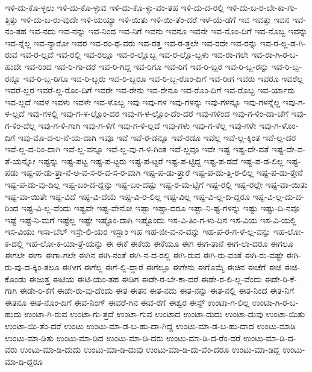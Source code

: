 {ಇಳಿ-ದು-ಕೊ-ಳ್ಳಲು
ಇಳಿ-ದು-ಕೊ-ಳ್ಳುವ
ಇಳಿ-ದು-ಕೊ-ಳ್ಳು-ವಂ-ತಹ
ಇಳಿ-ದು-ದ-ರಲ್ಲಿ
ಇಳಿ-ದು-ಬ-ರ-ಬೇ-ಕಾ-ಗು-ತ್ತಿತ್ತು
ಇಳಿ-ದು-ಬ-ರು-ವುದೇ
ಇಳಿ-ಯಯ್ಯಾ
ಇಳಿ-ಯಿತು
ಇಳಿ-ಯಿ-ತೆಂ-ದರೆ
ಇಳೆ-ಯೆ-ಡೆಗೆ
ಇವ
ಇವತ್ತು
ಇವನ
ಇವ-ನಂ-ತಹ
ಇವ-ನದು
ಇವ-ನನ್ನು
ಇವ-ನಿಂದ
ಇವ-ನಿಗೆ
ಇವನು
ಇವನೂ
ಇವನೇ
ಇವ-ನೊಂ-ದಿಗೆ
ಇವ-ನೊಬ್ಬ
ಇವನ್ನು
ಇವ-ನ್ನೆಲ್ಲ
ಇವ-ನ್ಯಾರೋ
ಇವರ
ಇವ-ರಂ-ಥ-ವರು
ಇವ-ರತ್ತ
ಇವ-ರ-ತ್ತಲೇ
ಇವ-ರದೇ
ಇವ-ರನ್ನು
ಇವ-ರ-ಲ್ಲ-ಡ-ಗಿ-ರುವ
ಇವ-ರ-ಲ್ಲದೆ
ಇವ-ರಲ್ಲಿ
ಇವ-ರಲ್ಲೂ
ಇವ-ರ-ಲ್ಲೊಬ್ಬ
ಇವ-ರ-ಲ್ಲೊ-ಬ್ಬಳು
ಇವ-ರಾ-ಗಲೇ
ಇವ-ರಾ-ಗಿ-ರ-ಬ-ಹುದೇ
ಇವ-ರಿಂದ
ಇವ-ರಿ-ಗಾ-ದರೆ
ಇವ-ರಿ-ಗಿದ್ದ
ಇವ-ರಿಗೂ
ಇವ-ರಿಗೆ
ಇವ-ರಿ-ಬ್ಬರ
ಇವ-ರಿ-ಬ್ಬ-ರನ್ನು
ಇವ-ರಿ-ಬ್ಬ-ರನ್ನೂ
ಇವ-ರಿ-ಬ್ಬ-ರಿಗೂ
ಇವ-ರಿ-ಬ್ಬರು
ಇವ-ರಿ-ಬ್ಬರೂ
ಇವ-ರಿ-ಬ್ಬ-ರೊಂ-ದಿಗೆ
ಇವ-ರೀಗ
ಇವರು
ಇವರೂ
ಇವರೆಲ್ಲ
ಇವರೆ-ಲ್ಲರ
ಇವರೆ-ಲ್ಲ-ರೊಂ-ದಿಗೆ
ಇವರೇ
ಇವ-ರೇನು
ಇವ-ರೇನೂ
ಇವ-ರೊಂ-ದಿಗೆ
ಇವ-ರೊಬ್ಬ
ಇವ-ರ್ಯಾರು
ಇವ-ಲ್ಲದೆ
ಇವಳ
ಇವಳು
ಇವಳೇ
ಇವ-ಳೊಬ್ಬ
ಇವು
ಇವು-ಗಳ
ಇವು-ಗಳನ್ನು
ಇವು-ಗಳನ್ನೂ
ಇವು-ಗಳನ್ನೆಲ್ಲ
ಇವು-ಗ-ಳ-ಲ್ಲದೆ
ಇವು-ಗಳಲ್ಲಿ
ಇವು-ಗ-ಳ-ಲ್ಲೊಂ-ದರ
ಇವು-ಗ-ಳ-ಲ್ಲೊಂ-ದೆಂ-ದರೆ
ಇವು-ಗಳಿಂದ
ಇವು-ಗ-ಳಿಂ-ದಾ-ಚೆಗೆ
ಇವು-ಗ-ಳಿಂ-ದೆಲ್ಲ
ಇವು-ಗ-ಳಿ-ಗಾಗಿ
ಇವು-ಗ-ಳಿಗೆ
ಇವು-ಗ-ಳಿ-ಲ್ಲದೆ
ಇವು-ಗಳು
ಇವು-ಗ-ಳೆಲ್ಲ
ಇವು-ಗಳೇ
ಇವು-ಗ-ಳೊಂ-ದಿಗೆ
ಇವು-ಮೊ-ದ-ಲ-ನೆ-ಯ-ದಾಗಿ
ಇವೂ
ಇವೆ
ಇವೆ-ರ-ಡನ್ನೂ
ಇವೆ-ರಡೂ
ಇವೆಲ್ಲ
ಇವೆ-ಲ್ಲ-ಕ್ಕಿಂತ
ಇವೆ-ಲ್ಲ-ದರ
ಇವೆ-ಲ್ಲ-ದ-ರಿಂ-ದಾಗಿ
ಇವೆ-ಲ್ಲ-ವನ್ನೂ
ಇವೆ-ಲ್ಲ-ವು-ಗ-ಳಿ-ಗಿಂತ
ಇವೆ-ಲ್ಲವೂ
ಇವೇ
ಇಷ್ಟ
ಇಷ್ಟ-ದೇ-ವತೆ
ಇಷ್ಟ-ದೇ-ವ-ತೆ-ಯನ್ನೋ
ಇಷ್ಟನ್ನು
ಇಷ್ಟ-ಪಟ್ಟ
ಇಷ್ಟ-ಪ-ಟ್ಟರು
ಇಷ್ಟ-ಪ-ಟ್ಟರೆ
ಇಷ್ಟ-ಪ-ಟ್ಟಿದ್ದ
ಇಷ್ಟ-ಪ-ಡದೆ
ಇಷ್ಟ-ಪ-ಡ-ಲಿಲ್ಲ
ಇಷ್ಟ-ಪಡು
ಇಷ್ಟ-ಪ-ಡು-ತ್ತಾ-ನೆ-ಅ-ವ-ಸ-ರ-ವ-ಸ-ರ-ವಾಗಿ
ಇಷ್ಟ-ಪ-ಡು-ತ್ತಾರೆ
ಇಷ್ಟ-ಪ-ಡು-ತ್ತಿ-ರ-ಲಿಲ್ಲ
ಇಷ್ಟ-ಪ-ಡು-ತ್ತೇನೆ
ಇಷ್ಟ-ಪ-ಡು-ವು-ದಿಲ್ಲ
ಇಷ್ಟ-ಬಂ-ದ-ದ್ದನ್ನು
ಇಷ್ಟ-ಬಂ-ದಷ್ಟು
ಇಷ್ಟ-ರ-ಮ-ಟ್ಟಿಗೆ
ಇಷ್ಟ-ರಲ್ಲಿ
ಇಷ್ಟ-ರಲ್ಲೇ
ಇಷ್ಟ-ವಾ-ಯಿತು
ಇಷ್ಟ-ವಾ-ಯಿತೇ
ಇಷ್ಟ-ವಿದೆ
ಇಷ್ಟ-ವಿ-ದೆಯೆ
ಇಷ್ಟ-ವಿ-ರ-ಲಿಲ್ಲ
ಇಷ್ಟ-ವಿಲ್ಲ
ಇಷ್ಟ-ವಿ-ಲ್ಲ-ದಿ-ದ್ದರೂ
ಇಷ್ಟ-ವಿ-ಲ್ಲ-ದು-ದ-ರಿಂದ
ಇಷ್ಟ-ವಿ-ಲ್ಲ-ವೆಂದು
ಇಷ್ಟವೇ
ಇಷ್ಟ-ವೇನೋ
ಇಷ್ಟಾ
ಇಷ್ಟಾ-ದರೂ
ಇಷ್ಟಾ-ನಿ-ಷ್ಟ-ಗಳನ್ನು
ಇಷ್ಟು
ಇಷ್ಟು-ದಿ-ನವೂ
ಇಷ್ಟೆ
ಇಷ್ಟೆ-ನಿ-ಮಗೆ
ಇಷ್ಟೆಲ್ಲ
ಇಷ್ಟೇ
ಇಷ್ಟೊಂ-ದಾಗಿ
ಇಷ್ಟೊಂದು
ಇಸ-ವಿ-ತಿಂ-ಗ-ಳು-ದಿನ
ಇಸ-ವಿಯ
ಇಸ-ವಿ-ಯಲ್ಲಿ
ಇಸ-ವಿಯು
ಇಸಾ-ಬೆಲ್
ಇಸ್ರೇ-ಲಿ-ಯರ
ಇಸ್ಲಾಂ
ಇಹ
ಇಹ-ಜೀ-ವ-ನ-ವನ್ನು
ಇಹ-ಪ-ರ-ಗ-ಳೆ-ಲ್ಲ-ವನ್ನು
ಇಹ-ಲೋ-ಕ-ದಲ್ಲಿ
ಇಹ-ಲೋ-ಕ-ಯಾ-ತ್ರೆ-ಯನ್ನು
ಈ
ಈಕೆ
ಈಕೆಯ
ಈಕೆಯೂ
ಈಗ
ಈಗ-ತಾನೆ
ಈಗ-ಲಾ-ದರೂ
ಈಗಲೂ
ಈಗಲೇ
ಈಗಾ
ಈಗಾ-ಗಲೇ
ಈಗಿನ
ಈಗಿ-ನಂತೆ
ಈಗಿ-ನ-ದ-ರಲ್ಲಿ
ಈಗಿ-ರುವ
ಈಗಿ-ರು-ವಂತೆ
ಈಗಿ-ರು-ವಷ್ಟೇ
ಈಗಿ-ರು-ವು-ದ-ಕ್ಕಿಂ-ತಲೂ
ಈಗೀಗ
ಈಗೆಲ್ಲ
ಈಗೆ-ಲ್ಲಿ-ದ್ದಾರೆ
ಈಗೆಲ್ಲೂ
ಈಗೇನು
ಈಗೊಮ್ಮೆ
ಈಚಿನ
ಈಚೆಗೆ
ಈಜಿ
ಈಜಿ-ಕೊಂಡು
ಈಜುತ್ತ
ಈಟಿಯ
ಈಟಿ-ಯಂ-ತಹ
ಈಡಿಗ
ಈಡೇ-ರ-ಬೇ-ಕಾ-ದರೆ
ಈಡೇ-ರ-ಲಿ-ಲ್ಲ-ವೆಂದು
ಈಡೇ-ರಿ-ಕೆ-ಗಾಗಿ
ಈಡೇ-ರಿ-ಕೆಗೆ
ಈಡೇ-ರು-ವು-ದೆಂದು
ಈತ
ಈತನ
ಈತ-ನದು
ಈತ-ನನ್ನು
ಈತ-ನಲ್ಲಿ
ಈತ-ನಿಂದ
ಈತ-ನಿಗೆ
ಈತನೂ
ಈತ-ನೊಂ-ದಿಗೆ
ಈವ-ನಿಂಗ್
ಈವರೆ-ಗಿನ
ಈವ-ರೆಗೆ
ಈಶ್ವರ
ಈಸ್ಟ್
ಉಂಟಾ-ಗ-ಲಿಲ್ಲ
ಉಂಟಾ-ಗಿ-ರ-ಬ-ಹುದು
ಉಂಟಾ-ಗಿ-ರುವ
ಉಂಟಾ-ಗು-ತ್ತದೆ
ಉಂಟಾ-ಗುವ
ಉಂಟಾದ
ಉಂಟಾ-ದುದು
ಉಂಟಾ-ದುವು
ಉಂಟಾ-ಯಿತು
ಉಂಟಾ-ಯಿ-ತೆಂ-ದರೆ
ಉಂಟು
ಉಂಟು-ಮಾ-ಡ-ಬ-ಹು-ದಾ-ಗಿದ್ದ
ಉಂಟು-ಮಾ-ಡ-ಬ-ಹು-ದಾದ
ಉಂಟು-ಮಾಡಿ
ಉಂಟು-ಮಾ-ಡಿತು
ಉಂಟು-ಮಾ-ಡಿದ
ಉಂಟು-ಮಾ-ಡಿ-ದರು
ಉಂಟು-ಮಾ-ಡಿ-ದ-ರೆಂ-ದರೆ
ಉಂಟು-ಮಾ-ಡಿ-ದ-ವರು
ಉಂಟು-ಮಾ-ಡಿ-ದುದು
ಉಂಟು-ಮಾ-ಡಿ-ದುವು
ಉಂಟು-ಮಾ-ಡಿ-ದು-ವೆಂ-ದರೂ
ಉಂಟು-ಮಾ-ಡಿದ್ದ
ಉಂಟು-ಮಾ-ಡಿ-ದ್ದರೂ
}
